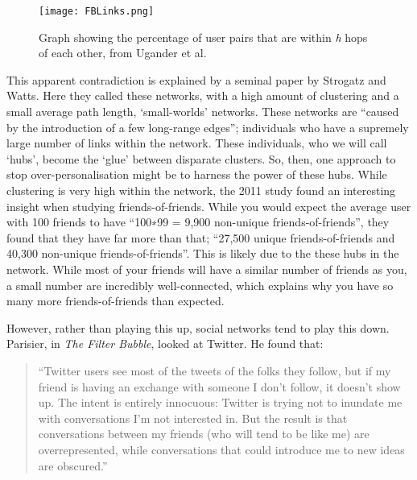\documentclass[]{article}
\begin{document}
\begin{figure}
\centering
\texttt{[image: FBLinks.png]}
\caption{Graph showing the percentage of user pairs that are within
\emph{h} hops of each other, from Ugander et
al.\autocite[pg 4, fig 2]{UganderAnatomyFacebookSocial2011}}
\end{figure}

This apparent contradiction is explained by a seminal paper by Strogatz
and Watts\autocite{WattsCollectivedynamicssmallworld1998}. Here they
called these networks, with a high amount of clustering and a small
average path length, `small-worlds'
networks\autocite[pg 440]{WattsCollectivedynamicssmallworld1998}. These
networks are ``caused by the introduction of a few long-range
edges''\autocite[pg 4]{WattsCollectivedynamicssmallworld1998};
individuals who have a supremely large number of links within the
network. These individuals, who we will call `hubs', become the `glue'
between disparate clusters. So, then, one approach to stop
over-personalisation might be to harness the power of these hubs. While
clustering is very high within the network, the 2011 study found an
interesting insight when studying friends-of-friends. While you would
expect the average user with 100 friends to have ``100∗99 = 9,900
non-unique
friends-of-friends''\autocite[pg 8]{UganderAnatomyFacebookSocial2011},
they found that they have far more than that; ``27,500 unique
friends-of-friends and 40,300 non-unique
friends-of-friends''\autocite[pg 8]{UganderAnatomyFacebookSocial2011}.
This is likely due to the these hubs in the network. While most of your
friends will have a similar number of friends as you, a small number are
incredibly well-connected, which explains why you have so many more
friends-of-friends than expected.

However, rather than playing this up, social networks tend to play this
down. Parisier, in \emph{The Filter Bubble}, looked at Twitter. He found
that:

\begin{quote}
``Twitter users see most of the tweets of the folks they follow, but if
my friend is having an exchange with someone I don't follow, it doesn't
show up. The intent is entirely innocuous: Twitter is trying not to
inundate me with conversations I'm not interested in. But the result is
that conversations between my friends (who will tend to be like me) are
overrepresented, while conversations that could introduce me to new
ideas are obscured.''\autocite[pg 150]{}
\end{quote}
\end{document}
